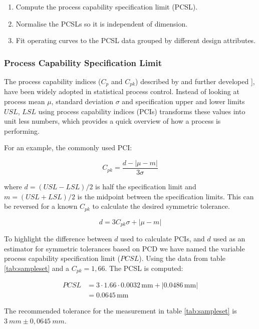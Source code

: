 \documentclass[aip,amsmath, reprint, author-year]{revtex4-1}
\begin{document}
\begin{enumerate}
	\item Compute the process capability specification limit (PCSL). 
	\item Normalise the PCSLs so it is independent of dimension. 
	\item Fit operating curves to the PCSL data grouped by different design attributes. 
\end{enumerate}

\subsubsection{Process Capability Specification Limit}
The process capability indices ($C_p$ and $C_{pk}$) described by \cite{kane1986process} and further developed \citep{wu2009overview}  ], have been widely adopted in statistical process control. Instead of looking at process mean $\mu$, standard deviation $\sigma$ and specification upper and lower limits $USL$, $LSL$ using process capability indices (PCIs) transforms these values into unit less numbers, which provides a quick overview of how a process is performing.

For an example, the commonly used PCI:

\begin{equation}
	C_{pk} = \frac{d - | \mu - m|}{3 \sigma} \nonumber
\end{equation}

where $d = (USL−LSL)/2$ is half the specification limit and $m = (USL + LSL)/2$ is the midpoint between the specification limits. This can be reversed for a known $C_{pk}$ to calculate the desired symmetric tolerance.

\begin{equation}
	d = 3 C_{pk} \sigma + | \mu - m|
\end{equation}

To highlight the difference between $d$ used to calculate PCIs, and $d$ used as an estimator for symmetric tolerances based on PCD we have named the variable process capability specification limit ($PCSL$). Using the data from table \ref{tab:sampleset} and a $C_{pk} = 1,66$. The PCSL is computed:

\begin{align*}
PCSL &= 3 \cdot 1.66 \cdot 0.0032 \, \mathrm{mm}
+ |0.0486  \, \mathrm{mm}| \\
&= 0.0645  \, \mathrm{mm}
\end{align*}

The recommended tolerance for the measurement in table  \ref{tab:sampleset}  is $3 \ mm \pm 0,0645 \ mm$. 
\end{document}
